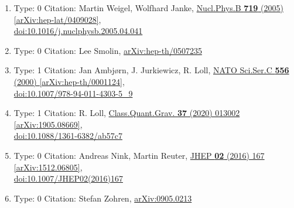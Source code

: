 \documentclass[a4paper,10pt]{article}
\begin{document}
\begin{enumerate}
\begin{enumerate}
  \item Type: 0 Citation: Martin Weigel, Wolfhard Janke, \href{https://www.doi.org/10.1016/j.nuclphysb.2005.04.041}{Nucl.Phys.B {\bf 719} (2005) }  \href{https://arxiv.org/abs/hep-lat/0409028}{[arXiv:hep-lat/0409028]},\\\href{https://www.doi.org/10.1016/j.nuclphysb.2005.04.041}{doi:10.1016/j.nuclphysb.2005.04.041}
  \item Type: 0 Citation: Lee Smolin, \href{https://arxiv.org/abs/hep-th/0507235}{arXiv:hep-th/0507235}
  \item Type: 1 Citation: Jan Ambjørn, J. Jurkiewicz, R. Loll, \href{https://www.doi.org/10.1007/978-94-011-4303-5_9}{NATO Sci.Ser.C {\bf 556} (2000) }  \href{https://arxiv.org/abs/hep-th/0001124}{[arXiv:hep-th/0001124]},\\\href{https://www.doi.org/10.1007/978-94-011-4303-5_9}{doi:10.1007/978-94-011-4303-5\_9}
  \item Type: 1 Citation: R. Loll, \href{https://www.doi.org/10.1088/1361-6382/ab57c7}{Class.Quant.Grav. {\bf 37} (2020) 013002}  \href{https://arxiv.org/abs/1905.08669}{[arXiv:1905.08669]},\\\href{https://www.doi.org/10.1088/1361-6382/ab57c7}{doi:10.1088/1361-6382/ab57c7}
  \item Type: 0 Citation: Andreas Nink, Martin Reuter, \href{https://www.doi.org/10.1007/JHEP02(2016)167}{JHEP {\bf 02} (2016) 167}  \href{https://arxiv.org/abs/1512.06805}{[arXiv:1512.06805]},\\\href{https://www.doi.org/10.1007/JHEP02(2016)167}{doi:10.1007/JHEP02(2016)167}
  \item Type: 0 Citation: Stefan Zohren, \href{https://arxiv.org/abs/0905.0213}{arXiv:0905.0213}

\end{enumerate}
\end{enumerate}
\end{document}
